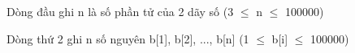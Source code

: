 Dòng đầu ghi n là số phần tử của 2 dãy số (3  $\le$  n  $\le$  100000)  

   Dòng thứ 2 ghi n số nguyên b[1], b[2], ..., b[n] (1  $\le$  b[i]  $\le$  100000)  

\